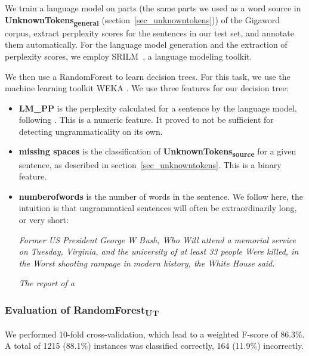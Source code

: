 \documentclass[a4paper,10pt]{scrartcl}
\theoremstyle{style}
\begin{document}
We train a language model on parts (the same parts we used as a word source in \textbf{UnknownTokens\textsubscript{general}} (section~\ref{sec_unknowntokens})) of the Gigaword corpus\citep{gigaword}, extract perplexity scores for the sentences in our test set, and annotate them automatically. For the language model generation and the extraction of perplexity scores, we employ SRILM~\citep{stolcke2002srilm}, a language modeling toolkit.


We then use a RandomForest \citep{breiman2001random} to learn decision trees. For this task, we use the machine learning toolkit WEKA \citep{hall2009weka}.
We use three features for our decision tree:

\begin{itemize}
	\item \textbf{LM\_PP} is the perplexity calculated for a sentence by the language model, following \cite{sun2007detecting}. This is a numeric feature. It proved to not be sufficient for detecting ungrammaticality on its own.
	\item \textbf{missing spaces} is the classification of \textbf{UnknownTokens\textsubscript{source}} for a given sentence, as described in section~\ref{sec_unknowntokens}. This is a binary feature.
	\item \textbf{numberofwords} is the number of words in the sentence. We follow \cite{wagner2007comparative} here, the intuition is that ungrammatical sentences will often be extraordinarily long, or very short:

		\textit{Former US President George W Bush, Who Will attend a memorial service on Tuesday, Virginia, and the university of at least 33 people Were killed, in the Worst shooting rampage in modern history, the White House said.}

		\textit{The report of a}
\end{itemize}

\subsubsection{Evaluation of RandomForest\textsubscript{UT}}
\label{S_eval_randomforest}

We performed 10-fold cross-validation, which lead to a weighted F-score of 86.3\%. A total of 1215 (88.1\%) instances was classified correctly, 164 (11.9\%) incorrectly.
\end{document}
